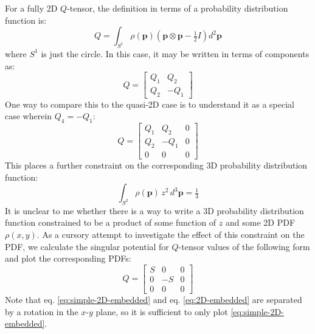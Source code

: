 \documentclass[reqno]{article}
\begin{document}
For a fully 2D $Q$-tensor, the definition in terms of a probability distribution function is:
\begin{equation}
    Q
    =
    \int_{S^1} \rho(\mathbf{p}) \left(\mathbf{p} \otimes \mathbf{p} - \tfrac12 I \right) d^2 \mathbf{p}
\end{equation}
where $S^1$ is just the circle.
In this case, it may be written in terms of components as:
\begin{equation}
    Q
    =
    \begin{bmatrix}
        Q_1 &Q_2 \\
        Q_2 &-Q_1
    \end{bmatrix}
\end{equation}
One way to compare this to the quasi-2D case is to understand it as a special case wherein $Q_4 = -Q_1$:
\begin{equation} \label{eq:2D-embedded}
    Q
    =
    \begin{bmatrix}
        Q_1 &Q_2 &0 \\
        Q_2 &-Q_1 &0 \\
        0 &0 &0
    \end{bmatrix}
\end{equation}
This places a further constraint on the corresponding 3D probability distribution function:
\begin{equation}
    \int_{S^2} \rho(\mathbf{p})\, z^2 \, d^3 \mathbf{p}
    =
    \tfrac13
\end{equation}
It is unclear to me whether there is a way to write a 3D probability distribution function constrained to be a product of some function of $z$ and some 2D PDF $\rho(x, y)$.
As a cursory attempt to investigate the effect of this constraint on the PDF, we calculate the singular potential for $Q$-tensor values of the following form and plot the corresponding PDFs:
\begin{equation} \label{eq:simple-2D-embedded}
    Q
    =
    \begin{bmatrix}
        S &0 &0 \\
        0 &-S &0 \\
        0 &0 &0
    \end{bmatrix}
\end{equation}
Note that eq. \eqref{eq:simple-2D-embedded} and eq. \eqref{eq:2D-embedded} are separated by a rotation in the $x$-$y$ plane, so it is sufficient to only plot \eqref{eq:simple-2D-embedded}.
\end{document}
